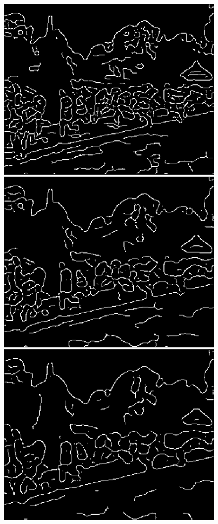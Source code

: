 \documentclass{article}
\begin{document}
\begin{figure}[!h]
		\includegraphics[scale=0.5]{E_canny_s3.png}
		\includegraphics[scale=0.5]{E_canny_s4.png}
		\includegraphics[scale=0.5]{E_canny_s5.png}
	\end{figure}
\end{document}
